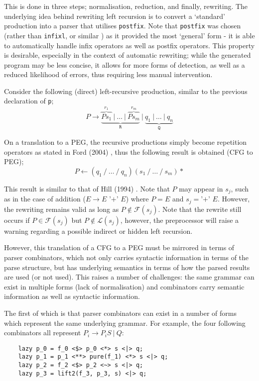 This is done in three steps; normalisation, reduction, and finally, rewriting.
The underlying idea behind rewriting left recursion is to convert a `standard' production into a parser that utilises \texttt{postfix}.
Note that \texttt{postfix} was chosen (rather than \texttt{infixl}, or similar \cite{willis21}) as it provided the most `general' form - it is able to automatically handle infix operators as well as postfix operators.
This property is desirable, especially in the context of automatic rewriting; while the generated program may be less concise, it allows for more forms of detection, as well as a reduced likelihood of errors, thus requiring less manual intervention.

Consider the following (direct) left-recursive production, similar to the previous declaration of \texttt{p};
$$P \to \underbrace{\overbrace{Ps_1}^{r_1}\ |\ \dots\ |\ \overbrace{Ps_m}^{r_m}}_{\texttt{R}}\ |\ \underbrace{q_1\ |\ \dots\ |\ q_n}_{\texttt{Q}}$$

On a translation to a PEG, the recursive productions simply become repetition operators as stated in Ford (2004) \cite{ford04}, thus the following result is obtained (CFG to PEG);
$$P \leftarrow (q_1\ /\ \dots\ /\ q_n)(s_1\ /\ \dots\ /\ s_m)*$$

This result is similar to that of Hill (1994) \cite{hill94}.
Note that $P$ may appear in $s_j$, such as in the case of addition ($E \to E \texttt{ '+' } E$) where $P = E$ and $s_j = \texttt{'+' } E$.
However, the rewriting remains valid as long as $P \notin \mathcal{F}(s_j)$.
Note that the rewrite still occurs if $P \in \mathcal{F}(s_j)$ but $P \notin \mathcal{L}(s_j)$, however, the preprocessor will raise a warning regarding a possible indirect or hidden left recursion.

However, this translation of a CFG to a PEG must be mirrored in terms of parser combinators, which not only carries syntactic information in terms of the parse structure, but has underlying semantics in terms of how the parsed results are used (or not used).
This raises a number of challenges: the same grammar can exist in multiple forms (lack of normalisation) and combinators carry semantic information as well as syntactic information.

The first of which is that parser combinators can exist in a number of forms which represent the same underlying grammar.
For example, the four following combinators all represent $P_i \to P_i S\ |\ Q$:

\begin{verbatim}
    lazy p_0 = f_0 <$> p_0 <*> s <|> q;
    lazy p_1 = p_1 <**> pure(f_1) <*> s <|> q;
    lazy p_2 = f_2 <$> p_2 <~> s <|> q;
    lazy p_3 = lift2(f_3, p_3, s) <|> q;
\end{verbatim}

